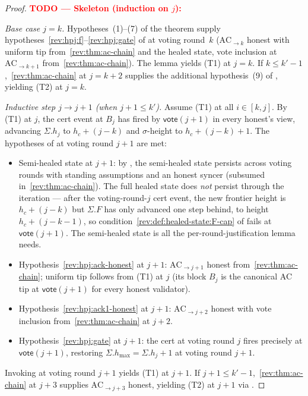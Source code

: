 \ifx\litemode\undefined\documentclass{article}\fi
\newcommand{\hmax}{\ensuremath{h_{\max}}\xspace}
\newcommand{\vote}{\ensuremath{\mathsf{vote}}}
\theoremstyle{plain}
\theoremstyle{definition}
\theoremstyle{remark}
\begin{document}
\begin{proof}
\textcolor{red}{\textbf{TODO --- Skeleton (induction on $j$):}}

\emph{Base case $j = k$.} Hypotheses~(1)--(7) of the theorem supply hypotheses~\ref{rev:hpj:f}--\ref{rev:hpj:gate} of  at voting round~$k$ ($\mathrm{AC}_{\to k}$ honest with uniform tip from~\ref{rev:thm:ac-chain} and the healed state, vote inclusion at $\mathrm{AC}_{\to k+1}$ from~\ref{rev:thm:ac-chain}). The lemma yields (T1) at $j = k$. If $k \leq k' - 1$,~\ref{rev:thm:ac-chain} at $j = k+2$ supplies the additional hypothesis~(9) of , yielding (T2) at $j = k$.

\emph{Inductive step $j \to j+1$ (when $j+1 \leq k'$).} Assume (T1) at all $i \in [k, j]$.
By (T1) at $j$, the cert event at $B_j$ has fired by $\vote(j+1)$ in every honest's view, advancing $\Sigma.h_j$ to $h_c + (j - k)$ and $\sigma$-height to $h_c + (j - k) + 1$. The hypotheses of  at voting round $j+1$ are met:
\begin{itemize}
  \item Semi-healed state at $j+1$: by , the semi-healed state persists across voting rounds with standing assumptions and an honest syncer (subsumed in~\ref{rev:thm:ac-chain}). The full healed state does \emph{not} persist through the iteration --- after the voting-round-$j$ cert event, the new frontier height is $h_c + (j-k)$ but $\Sigma.F$ has only advanced one step behind, to height $h_c + (j-k-1)$, so condition~\ref{rev:def:healed-state:F-cap} of  fails at $\vote(j+1)$. The semi-healed state is all the per-round-justification lemma needs.
  \item Hypothesis~\ref{rev:hpj:ack-honest} at $j+1$: $\mathrm{AC}_{\to j+1}$ honest from~\ref{rev:thm:ac-chain}; uniform tip follows from (T1) at $j$ (its block $B_j$ is the canonical AC tip at $\vote(j+1)$ for every honest validator).
  \item Hypothesis~\ref{rev:hpj:ack1-honest} at $j+1$: $\mathrm{AC}_{\to j+2}$ honest with vote inclusion from~\ref{rev:thm:ac-chain} at $j+2$.
  \item Hypothesis~\ref{rev:hpj:gate} at $j+1$: the cert at voting round $j$ fires precisely at $\vote(j+1)$, restoring $\Sigma.\hmax = \Sigma.h_j + 1$ at voting round $j+1$.
\end{itemize}
Invoking  at voting round $j+1$ yields (T1) at $j+1$. If $j+1 \leq k' - 1$,~\ref{rev:thm:ac-chain} at $j+3$ supplies $\mathrm{AC}_{\to j+3}$ honest, yielding (T2) at $j+1$ via .
\end{proof}
\end{document}
